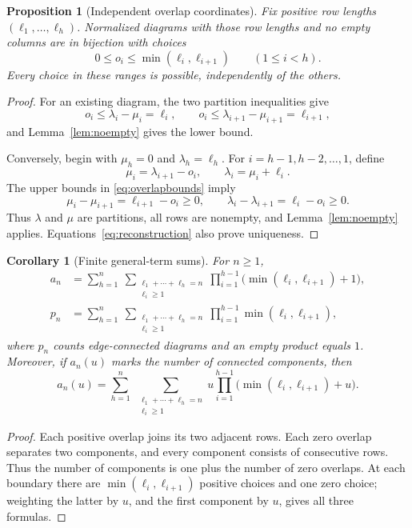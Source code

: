 \documentclass[11pt,letterpaper]{article}
\numberwithin{equation}{section}
\newtheorem{proposition}[theorem]{Proposition}
\newtheorem{corollary}[theorem]{Corollary}
\theoremstyle{definition}
\begin{document}
\begin{proposition}[Independent overlap coordinates]
\label{prop:rowcoords}
Fix positive row lengths $(\ell_1,\ldots,\ell_h)$. Normalized diagrams with
those row lengths and no empty columns are in bijection with choices
\begin{equation}
 0\le o_i\le\min(\ell_i,\ell_{i+1})\qquad(1\le i<h).
 \label{eq:overlapbounds}
\end{equation}
Every choice in these ranges is possible, independently of the others.
\end{proposition}
\begin{proof}
For an existing diagram, the two partition inequalities give
\[
 o_i\le\lambda_i-\mu_i=\ell_i,
 \qquad o_i\le\lambda_{i+1}-\mu_{i+1}=\ell_{i+1},
\]
and Lemma~\ref{lem:noempty} gives the lower bound.

Conversely, begin with $\mu_h=0$ and $\lambda_h=\ell_h$. For
$i=h-1,h-2,\ldots,1$, define
\begin{equation}
 \mu_i=\lambda_{i+1}-o_i,\qquad
 \lambda_i=\mu_i+\ell_i.
 \label{eq:reconstruction}
\end{equation}
The upper bounds in \eqref{eq:overlapbounds} imply
\[
 \mu_i-\mu_{i+1}=\ell_{i+1}-o_i\ge0,
 \qquad
 \lambda_i-\lambda_{i+1}=\ell_i-o_i\ge0.
\]
Thus $\lambda$ and $\mu$ are partitions, all rows are nonempty, and
Lemma~\ref{lem:noempty} applies. Equations~\eqref{eq:reconstruction} also
prove uniqueness.
\end{proof}

\begin{corollary}[Finite general-term sums]
\label{cor:compositions}
For $n\ge1$,
\begin{align}
 a_n&=\sum_{h=1}^{n}\ \sum_{\substack{\ell_1+\cdots+\ell_h=n\\\ell_i\ge1}}
       \prod_{i=1}^{h-1}\bigl(\min(\ell_i,\ell_{i+1})+1\bigr),
       \label{eq:allcomposition}\\
 p_n&=\sum_{h=1}^{n}\ \sum_{\substack{\ell_1+\cdots+\ell_h=n\\\ell_i\ge1}}
       \prod_{i=1}^{h-1}\min(\ell_i,\ell_{i+1}),
       \label{eq:connectedcomposition}
\end{align}
where $p_n$ counts edge-connected diagrams and an empty product equals $1$.
Moreover, if $a_n(u)$ marks the number of connected components, then
\begin{equation}
 a_n(u)=\sum_{h=1}^{n}\ \sum_{\substack{\ell_1+\cdots+\ell_h=n\\\ell_i\ge1}}
 u\prod_{i=1}^{h-1}\bigl(\min(\ell_i,\ell_{i+1})+u\bigr).
 \label{eq:componentcomposition}
\end{equation}
\end{corollary}
\begin{proof}
Each positive overlap joins its two adjacent rows. Each zero overlap
separates two components, and every component consists of consecutive rows.
Thus the number of components is one plus the number of zero overlaps.
At each boundary there are $\min(\ell_i,\ell_{i+1})$ positive choices and
one zero choice; weighting the latter by $u$, and the first component by
$u$, gives all three formulas.
\end{proof}
\end{document}
